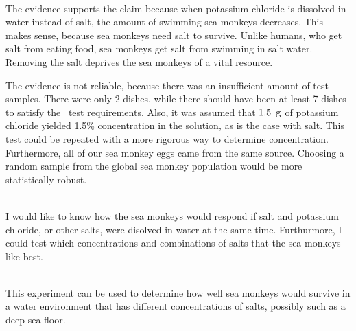 \documentclass[12pt]{article}
\begin{document}
\\
The evidence supports the claim because when potassium chloride is dissolved in water instead of salt, the amount of swimming sea
monkeys decreases. This makes sense, because sea monkeys need salt to survive. Unlike humans, who get salt from eating food, sea
monkeys get salt from swimming in salt water. Removing the salt deprives the sea monkeys of a vital resource.\double

The evidence is not reliable, because there was an insufficient amount of test samples. There were only 2 dishes, while there
should have been at least 7 dishes to satisfy the \chisq\ test requirements. Also, it was assumed that $1.5\operatorname{\ g}$ of potassium
chloride yielded 1.5\% concentration in the solution, as is the case with salt. This test could be repeated with a more rigorous
way to determine concentration. Furthermore, all of our sea monkey eggs came from the same source. Choosing a random sample from
the global sea monkey population would be more statistically robust.\double

\\
I would like to know how the sea monkeys would respond if salt and potassium chloride, or other salts, were disolved in water at
the same time. Furthurmore, I could test which concentrations and combinations of salts that the sea monkeys like best.\double

\\
This experiment can be used to determine how well sea monkeys would survive in a water environment that has different
concentrations of salts, possibly such as a deep sea floor.
\end{document}
